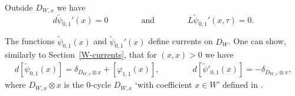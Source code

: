 \begin{lemma}\label{xi'closed}
Outside $D_{W,x}$ we have
 \[
d \tilde{\psi}_{0,1}'(x) = 0 \qquad \qquad \text{and} \qquad \qquad 
L \tilde{\psi}_{0,1}'(x,\tau) = 0.
\]
\end{lemma}






\begin{remark}
The functions $\tilde{\psi}_{0,1}(x)$ and $\tilde{\psi}_{0,1}'(x)$ define currents on $D_W$. One can show, similarly to Section~\ref{W-currents}, that for $(x,x)>0$ we have
\begin{align*}
d[\tilde{\psi}_{0,1}(x)] = \delta_{D_{W,x} \otimes x} + [\varphi_{1,1}(x)], \qquad \qquad 
d[\tilde{\psi}'_{0,1}(x)] = -\delta_{D_{W,x} \otimes x},
\end{align*}
where $D_{W,x} \otimes x$ is the $0$-cycle $D_{W,x}$ `with coefficient $x \in W$' defined in \cite{FMcoeff}. 
\end{remark}

